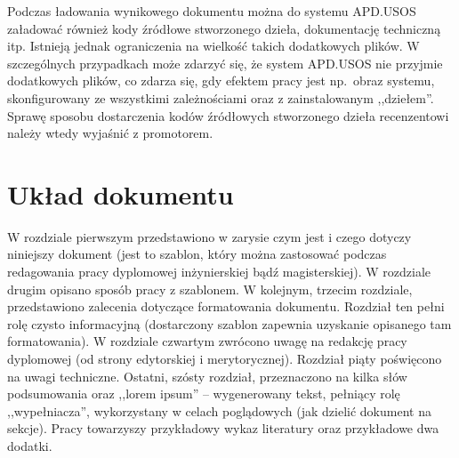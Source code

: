 Podczas ładowania wynikowego dokumentu można do systemu APD.USOS załadować również kody źródłowe stworzonego dzieła, dokumentację techniczną itp. Istnieją jednak ograniczenia na wielkość takich dodatkowych plików. W szczególnych przypadkach może zdarzyć się, że system APD.USOS nie przyjmie dodatkowych plików, co zdarza się, gdy efektem pracy jest np.\ obraz systemu, skonfigurowany ze wszystkimi zależnościami oraz z zainstalowanym ,,dziełem''. Sprawę sposobu dostarczenia kodów źródłowych stworzonego dzieła recenzentowi należy wtedy wyjaśnić z promotorem.

\section{Układ dokumentu}
W rozdziale pierwszym przedstawiono w zarysie czym jest i czego dotyczy niniejszy dokument (jest to szablon, który można zastosować podczas redagowania pracy dyplomowej inżynierskiej bądź magisterskiej). W rozdziale drugim opisano sposób pracy z szablonem. W kolejnym, trzecim rozdziale, przedstawiono zalecenia dotyczące formatowania dokumentu. Rozdział ten pełni rolę czysto informacyjną (dostarczony szablon zapewnia uzyskanie opisanego tam formatowania).
W rozdziale czwartym zwrócono uwagę na redakcję pracy dyplomowej (od strony edytorskiej i merytorycznej).
Rozdział piąty poświęcono na uwagi techniczne. Ostatni, szósty rozdział, przeznaczono na kilka słów podsumowania oraz ,,lorem ipsum'' -- wygenerowany tekst, pełniący rolę ,,wypełniacza'', wykorzystany w celach poglądowych (jak dzielić dokument na sekcje).
Pracy towarzyszy przykładowy wykaz literatury oraz przykładowe dwa dodatki. 

